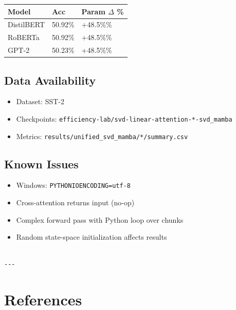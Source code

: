 \begin{table}[H]
\centering
\small
\begin{tabular}{lll}
\toprule
\textbf{Model} & \textbf{Acc} & \textbf{Param $\Delta$ \%} \\
\midrule
DistilBERT & 50.92\% & +48.5\%\% \\
RoBERTa & 50.92\% & +48.5\%\% \\
GPT-2 & 50.23\% & +48.5\%\% \\
\bottomrule
\end{tabular}
\end{table}

\subsection{Data Availability}

\begin{itemize}
\item Dataset: SST-2
\item Checkpoints: \texttt{efficiency-lab/svd-linear-attention-*-svd\_mamba}
\item Metrics: \texttt{results/unified\_svd\_mamba/*/summary.csv}

\end{itemize}
\subsection{Known Issues}

\begin{itemize}
\item Windows: \texttt{PYTHONIOENCODING=utf-8}
\item Cross-attention returns input (no-op)
\item Complex forward pass with Python loop over chunks
\item Random state-space initialization affects results
\end{itemize}
\begin{lstlisting}

---
\end{lstlisting}


\section{References}

